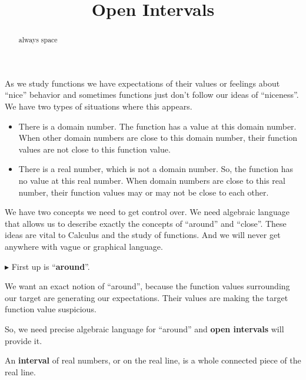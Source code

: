 \documentclass{ximera}
\title{Open Intervals}
\begin{document}
\begin{abstract}
always space
\end{abstract}
\maketitle




As we study functions we have expectations of their values or feelings about ``nice'' behavior and sometimes functions just don't follow our ideas of ``niceness''.  We have two types of situations where this appears.

\begin{itemize}
\item There is a domain number. The function has a value at this domain number. When other domain numbers are close to this domain number, their function values are not close to this function value.
\item There is a real number, which is not a domain number. So, the function has no value at this real number. When  domain numbers are close to this real number, their function values may or may not be close to each other.
\end{itemize}


We have two concepts we need to get control over. We need algebraic language that allows us to describe exactly the concepts of ``around'' and ``close''.  These ideas are vital to Calculus and the study of functions.  And we will never get anywhere with vague or graphical language.


\textbf{\textcolor{red!70!darkgray}{$\blacktriangleright$}} First up is ``\textbf{\textcolor{purple!85!blue}{around}}''.



We want an exact notion of ``around'', because the function values surrounding our target are generating our expectations.  Their values are making the target function value suspicious.

So, we need precise algebraic language for ``around'' and \textbf{open intervals} will provide it.















An \textbf{interval} of real numbers, or on the real line, is a whole connected piece of the real line.
\end{document}

